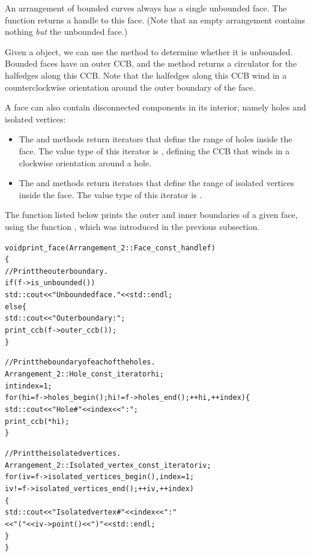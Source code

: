 An arrangement of bounded curves always has a single unbounded face.
The function  returns a handle to this face.
(Note that an empty arrangement contains nothing {\em but} the
unbounded face.)

Given a  object, we can use the 
method to determine whether it is unbounded. Bounded faces have an
outer CCB, and the  method returns a circulator
for the halfedges along this CCB. Note that the halfedges along
this CCB wind in a counterclockwise orientation around the outer
boundary of the face.

A face can also contain disconnected components in its interior,
namely holes and isolated vertices:
\begin{itemize}
\item The  and  methods return
 iterators that define the range
of holes inside the face. The value type of this iterator is
, defining the CCB that winds in a
clockwise orientation around a hole.
\item The  and
 methods return
 iterators that
define the range of isolated vertices inside the face. The value
type of this iterator is .
\end{itemize}

The function  listed below prints the outer and
inner boundaries of a given face, using the function ,
which was introduced in the previous subsection.
\begin{alltt}
void print_face (Arrangement_2::Face_const_handle f)
\{
  // Print the outer boundary.
  if (f->is_unbounded())
    std::cout << "Unbounded face. " << std::endl;
  else \{
    std::cout << "Outer boundary: ";
    print_ccb (f->outer_ccb());
  \}

  // Print the boundary of each of the holes.
  Arrangement_2::Hole_const_iterator hi;
  int                                 index = 1;
  for (hi = f->holes_begin(); hi != f->holes_end(); ++hi, ++index) \{
    std::cout << "    Hole #" << index << ": ";
    print_ccb (*hi);
  \}

  // Print the isolated vertices.
  Arrangement_2::Isolated_vertex_const_iterator iv;
  for (iv = f->isolated_vertices_begin(), index = 1;
       iv != f->isolated_vertices_end(); ++iv, ++index)
  \{
    std::cout << "    Isolated vertex #" << index << ": "
              << "(" << iv->point() << ")" << std::endl;
  \}
\}
\end{alltt}

